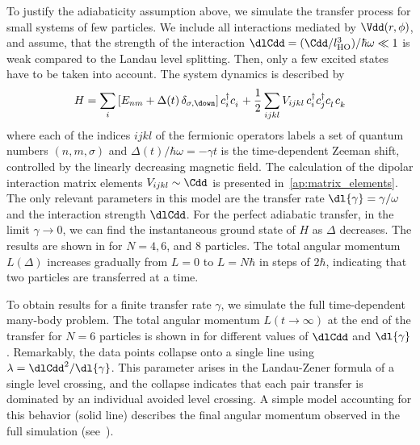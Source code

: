 To justify the adiabaticity assumption above, we simulate the transfer process for small systems of few particles. We include all interactions mediated by $\Vdd(r,\phi)$, and assume, that the strength of the interaction $\dlCdd=(\Cdd/l_\text{HO}^3)/\hbar\omega \ll 1$ is weak compared to the Landau level splitting. Then, only a few excited states have to be taken into account.
The system dynamics is described by
\begin{align*}
H=\sum_{i} \left[ E_{nm}  + \Delta(t)\,\delta_{\sigma,\down} \right] {c}^\dagger_{i}{c}^{\phantom\dagger}_{i} +  \frac{1}{2}\sum_{ijkl} V_{ijkl}\, {c}^\dagger_{i} {c}^\dagger_{j} {c}^{\phantom\dagger}_{l}{c}^{\phantom\dagger}_{k}
\end{align*}
where each of the indices $ijkl$ of the fermionic operators labels a set of quantum numbers $(n,m,\sigma)$ and $\Delta(t)/\hbar\omega = -\gamma t$ is the time-dependent Zeeman shift, controlled by the linearly decreasing magnetic field. The calculation of the dipolar interaction matrix elements $V_{ijkl}\sim\Cdd$ is presented in~\cref{ap:matrix_elements}. The only relevant parameters in this model are the transfer rate  $\dl{\gamma}=\gamma/\omega$ and the interaction strength $\dlCdd$.
For the perfect adiabatic transfer, in the limit $\gamma\rightarrow 0$, we can find the instantaneous ground state of $H$ as $\Delta$ decreases. The results are shown in  for $N=4,6$, and $8$ particles. The total angular momentum $L(\Delta)$ increases gradually from $L=0$ to $L=N\hbar$ in steps of $2\hbar$, indicating that two particles are transferred at a time.

To obtain results for a finite transfer rate $\gamma$, we simulate the full time-dependent many-body problem.
The total angular momentum $L(t\rightarrow\infty)$ at the end of the transfer for $N=6$ particles is shown in  for different values of $\dlCdd$ and $\dl{\gamma}$.  Remarkably, the data points collapse onto a single line using  $\lambda = \dlCdd^2/\dl{\gamma}$. This parameter arises in the Landau-Zener formula of a single level crossing, and the collapse indicates that
each pair transfer is dominated by an individual avoided level crossing. A simple model accounting for this behavior (solid line) describes the final angular momentum observed in the full simulation (see~).

